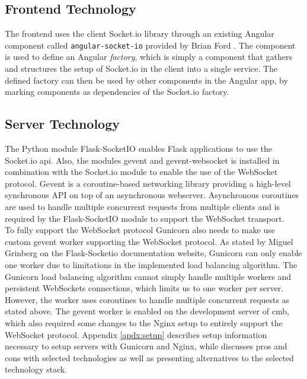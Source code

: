 \subsection{Frontend Technology}
\label{sub-sec:real-time-frontend}
The frontend uses the client Socket.io library \cite{SOCKETIO} through an existing Angular component called \texttt{angular-socket-io} provided by Brian Ford \cite{ANGULARSOCKETIO}. The component is used to define an Angular \textit{factory}, which is simply a component that gathers and structures the setup of Socket.io in the client into a single service. The defined factory can then be used by other components in the Angular app, by marking components as dependencies of the Socket.io factory. \\

\subsection{Server Technology}
\label{sub-sec:real-time-server}
The Python module Flask-SocketIO \cite{FLASKSOCKETIO} enables Flask applications to use the Socket.io \gls{api}. Also, the modules gevent \cite{GEVENT} and gevent-websocket \cite{GEVENTWEBSOCKET}  is installed in combination with the Socket.io module to enable the use of the WebSocket protocol. Gevent is a coroutine-based networking library providing a high-level synchronous API on top of an asynchronous webserver. Asynchronous coroutines are used to handle multiple concurrent requests from multiple clients and is required by the Flask-SocketIO module to support the WebSocket transport. \\

To fully support the WebSocket protocol Gunicorn also needs to make use custom gevent worker supporting the WebSocket protocol. As stated by Miguel Grinberg on the Flask-Socketio documentation website, Gunicorn can only enable one worker due to limitations in the implemented load balancing algorithm. The Gunicorn load balancing algorithm cannot simply handle multiple workers and persistent WebSockets connections, which limits us to one worker per server. However, the worker uses coroutines to handle multiple concurrent requests as stated above. The gevent worker is enabled on the development server of \gls{cmb}, which also required some changes to the Nginx setup to entirely support the WebSocket protocol. Appendix \ref{apdx:setup} describes setup information necessary to setup servers with Gunicorn and Nginx, while  discusses pros and cons with selected technologies as well as presenting alternatives to the selected technology stack.

